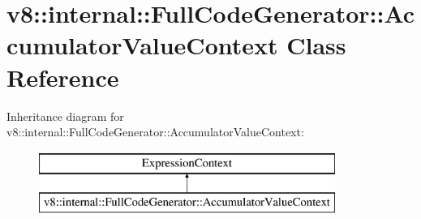 \hypertarget{classv8_1_1internal_1_1_full_code_generator_1_1_accumulator_value_context}{}\section{v8\+:\+:internal\+:\+:Full\+Code\+Generator\+:\+:Accumulator\+Value\+Context Class Reference}
\label{classv8_1_1internal_1_1_full_code_generator_1_1_accumulator_value_context}
Inheritance diagram for v8\+:\+:internal\+:\+:Full\+Code\+Generator\+:\+:Accumulator\+Value\+Context\+:\begin{figure}[H]
\begin{center}
\leavevmode
\includegraphics[height=2.000000cm]{classv8_1_1internal_1_1_full_code_generator_1_1_accumulator_value_context}
\end{center}
\end{figure}
